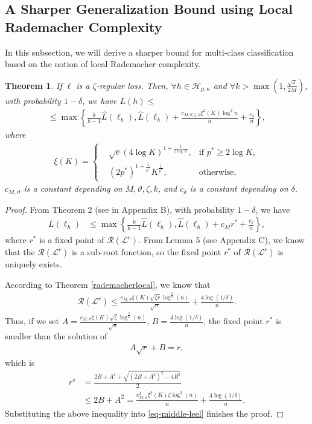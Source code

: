 \documentclass{article}
\newtheorem{theorem}{Theorem}
\begin{document}
\subsection{A Sharper Generalization Bound using Local Rademacher Complexity}
In this subsection, we will derive a sharper bound for multi-class classification based on
the notion of local Rademacher complexity.
\begin{theorem}
\label{theorem-finally}
  If $\ell$ is a $\zeta$-regular loss.
  Then, $\forall h\in\mathcal{H}_{p,\kappa}$ and $\forall k>\max(1,\frac{\sqrt{2}}{2M})$,  with probability
  $1-\delta$, we have $L(h)\leq $
  \begin{align*}
   \leq \max\left\{
        \frac{k}{k-1}\hat{L}(\ell_h),
       \hat{L}(\ell_h)+\frac{c_{M,\vartheta,\zeta, k}\xi^2(K) \log^3 n}{n}+\frac{c_{\delta}}{n}
     \right\},
\end{align*}
where \begin{align*}
  \xi(K)=
  \left\{
      \begin{aligned}
      &\sqrt{e}(4\log K)^{1+\frac{1}{2\log K}}, &\text{if } p^\ast\geq 2\log K,\\
      &(2p^\ast)^{1+\frac{1}{p^\ast}}K^{\frac{1}{p^\ast}}, &\text{otherwise},
      \end{aligned}
      \right.
  \end{align*}
  $c_{M,\vartheta}$ is a constant depending on $M,\vartheta,\zeta, k$,
  and $c_{\delta}$ is a constant depending on $\delta$.
\end{theorem}
\begin{proof}
From Theorem 2 (see in Appendix B),
with probability $1-\delta$,
we have
\begin{align}
\label{eq-middle-leel}
   L(\ell_h)&\leq \max\left\{
        \frac{k}{k-1}\hat{L}(\ell_h),
       \hat{L}(\ell_h)+c_Mr^\ast+\frac{c_\delta}{n}
     \right\},
\end{align}
where $r^\ast$ is a fixed point of $\mathcal{R}(\mathcal{L}^r)$.
From Lemma 5 (see  Appendix C),
we know that the $\mathcal{R}(\mathcal{L}^r)$ is a sub-root function,
so the fixed point $r^\ast$ of $\mathcal{R}(\mathcal{L}^r)$ is uniquely exists.

According to  Theorem \ref{rademacherlocal}, we know that
\begin{align*}
    \mathcal{R}(\mathcal{L}^r) \leq \frac{c_{M,\vartheta}\xi(K)\sqrt{\zeta r}\log^{\frac{3}{2}}(n)}{\sqrt{n}}+\frac{4\log(1/\delta)}{n}.
  \end{align*}
Thus, if we set $A=\frac{c_{M,\vartheta}\xi(K)\sqrt{\zeta}\log^{\frac{3}{2}}(n)}{\sqrt{n}}$, $B=\frac{4\log(1/\delta)}{n}$,
the fixed point $r^\ast$ is smaller than the solution of
   \begin{align*}
     A\sqrt{r}+B=r,
   \end{align*}
   which is
   \begin{align*}
     r^s&=\frac{2B+A^2+\sqrt{(2B+A^2)^2-4B^2}}{2}\\
     &\leq 2B+A^2
     =\frac{c_{M,\vartheta}^2\xi^2(K)\zeta\log^3(n)}{n}+\frac{4\log(1/\delta)}{n}.
   \end{align*}
   Substituting the above inequality into \eqref{eq-middle-leel} finishes the proof.
\end{proof}
\end{document}
